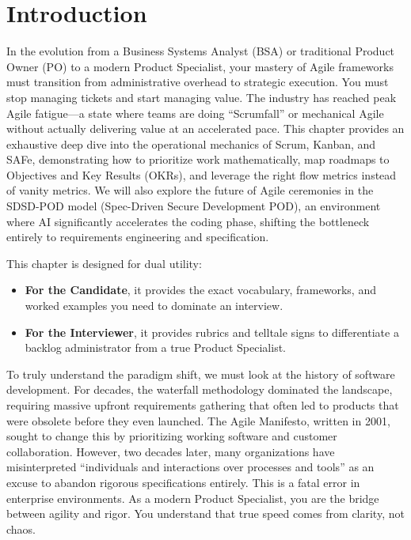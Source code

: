 \section{Introduction}\label{introduction}

In the evolution from a Business Systems Analyst (BSA) or traditional
Product Owner (PO) to a modern Product Specialist, your mastery of Agile
frameworks must transition from administrative overhead to strategic
execution. You must stop managing tickets and start managing value. The
industry has reached peak Agile fatigue---a state where teams are doing
``Scrumfall'' or mechanical Agile without actually delivering value at
an accelerated pace. This chapter provides an exhaustive deep dive into
the operational mechanics of Scrum, Kanban, and SAFe, demonstrating how
to prioritize work mathematically, map roadmaps to Objectives and Key
Results (OKRs), and leverage the right flow metrics instead of vanity
metrics. We will also explore the future of Agile ceremonies in the
SDSD-POD model (Spec-Driven Secure Development POD), an environment
where AI significantly accelerates the coding phase, shifting the
bottleneck entirely to requirements engineering and specification.

This chapter is designed for dual utility:

\begin{itemize}
\tightlist
\item
  \textbf{For the Candidate}, it provides the exact vocabulary,
  frameworks, and worked examples you need to dominate an interview.
\item
  \textbf{For the Interviewer}, it provides rubrics and telltale signs
  to differentiate a backlog administrator from a true Product
  Specialist.
\end{itemize}

To truly understand the paradigm shift, we must look at the history of
software development. For decades, the waterfall methodology dominated
the landscape, requiring massive upfront requirements gathering that
often led to products that were obsolete before they even launched. The
Agile Manifesto, written in 2001, sought to change this by prioritizing
working software and customer collaboration. However, two decades later,
many organizations have misinterpreted ``individuals and interactions
over processes and tools'' as an excuse to abandon rigorous
specifications entirely. This is a fatal error in enterprise
environments. As a modern Product Specialist, you are the bridge between
agility and rigor. You understand that true speed comes from clarity,
not chaos.

